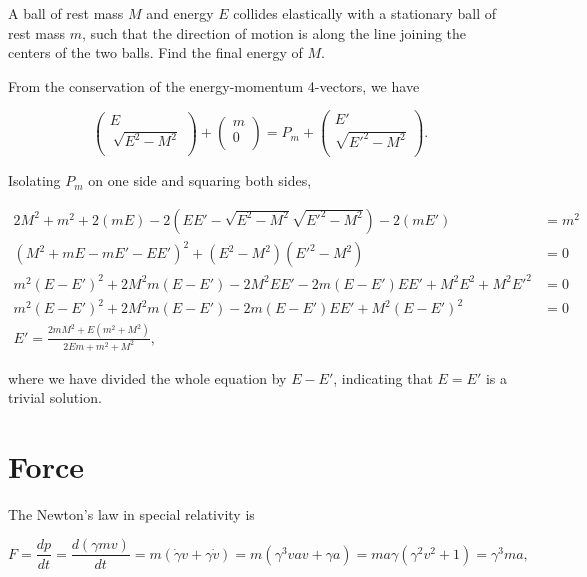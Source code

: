 \documentclass[english,a4paper,12pt]{report}
\begin{document}
{A ball of rest mass \(M\) and energy \(E\) collides elastically with a stationary ball of rest mass \(m\), such that the direction of motion is along the line joining the centers of the two balls. Find the final energy of \(M\).}
{From the conservation of the energy-momentum 4-vectors, we have

\begin{equation}
    \begin{pmatrix}
         E\\\
         \sqrt{E^2-M^2}  \\
    \end{pmatrix} + \begin{pmatrix}
         m \\
         0 \\
    \end{pmatrix} = P_{m} + \begin{pmatrix}
         E' \\
         \sqrt{E'^2-M^2}  \\
    \end{pmatrix}.
\end{equation}

Isolating \(P_{m} \) on one side and squaring both sides, 

\begin{equation}
    \begin{aligned} 
    2M^2 + m^2 + 2(mE) - 2 (EE' - \sqrt{E^2-M^2}\sqrt{E'^2-M^2}  ) -2(mE') &= m^2 \\
    (M^2 + mE - mE' - EE')^2 +(E^2-M^2)(E'^2-M^2) &=0  \\
    m^2 (E-E')^2 + 2M^2m(E-E') - 2M^2EE' - 2m(E-E')EE' + M^2E^2 + M^2E'^2 &=0 \\ 
    m^2(E-E')^2 + 2M^2m(E-E') - 2m(E-E')EE' +M^2(E-E')^2 &= 0\\
    E' = \frac{2mM^2+E(m^2+M^2)}{2Em+m^2+M^2}, 
    \end{aligned} 
\end{equation}

where we have divided the whole equation by \(E-E'\), indicating that \(E= E'\) is a trivial solution. 
} 


\section{Force}

The Newton's law in special relativity is 

\begin{equation}
    F = \frac{dp}{dt} = \frac{d(\gamma mv)}{dt} = m(\dot{\gamma }v + \gamma \dot{v}  ) = m(\gamma ^3 vav + \gamma a) = ma\gamma (\gamma ^2v^2 + 1) = \gamma ^3 ma,
\end{equation}
\end{document}
